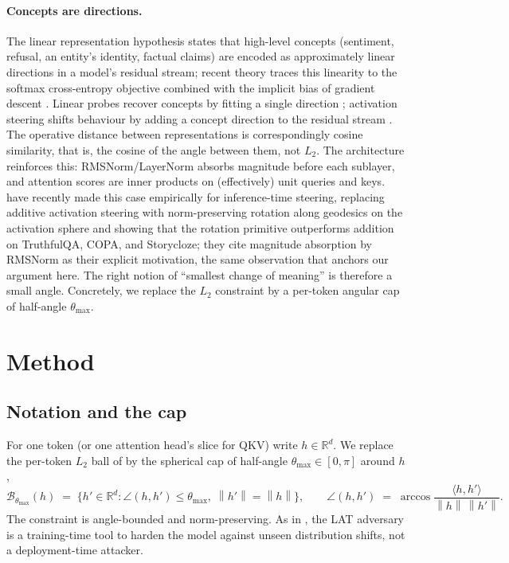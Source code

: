 \documentclass[11pt]{article}
\newcommand{\R}{\mathbb{R}}
\newcommand{\thmax}{\theta_{\max}}
\newcommand{\norm}[1]{\left\lVert#1\right\rVert}
\newcommand{\inner}[2]{\langle #1, #2 \rangle}
\begin{document}
\paragraph{Concepts are directions.} The linear representation hypothesis \citep[LRH;][]{mikolov2013distributed, park2023linear} states that high-level concepts (sentiment, refusal, an entity's identity, factual claims) are encoded as approximately linear directions in a model's residual stream; recent theory traces this linearity to the softmax cross-entropy objective combined with the implicit bias of gradient descent \citep{jiang2024origins}. Linear probes recover concepts by fitting a single direction \citep{burns2022discovering, marks2023geometry}; activation steering shifts behaviour by adding a concept direction to the residual stream \citep{turner2023activation, zou2023representation}. The operative distance between representations is correspondingly cosine similarity, that is, the cosine of the angle between them, not $L_2$. The architecture reinforces this: RMSNorm/LayerNorm absorbs magnitude before each sublayer, and attention scores are inner products on (effectively) unit queries and keys. \citet{you2026spherical} have recently made this case empirically for inference-time steering, replacing additive activation steering with norm-preserving rotation along geodesics on the activation sphere and showing that the rotation primitive outperforms addition on TruthfulQA, COPA, and Storycloze; they cite magnitude absorption by RMSNorm as their explicit motivation, the same observation that anchors our argument here. The right notion of ``smallest change of meaning'' is therefore a small angle. Concretely, we replace the $L_2$ constraint by a per-token angular cap of half-angle $\thmax$.

\section{Method}

\subsection{Notation and the cap}

For one token (or one attention head's slice for QKV) write $h \in \R^d$. We replace the per-token $L_2$ ball of \citet{casper2024lat} by the spherical cap of half-angle $\thmax \in [0, \pi]$ around $h$,
\begin{equation}
\mathcal{B}_{\thmax}(h) \;=\; \big\{ h' \in \R^d : \angle(h, h') \le \thmax,\; \norm{h'} = \norm{h} \big\},
\qquad
\angle(h, h') \;=\; \arccos\!\frac{\inner{h}{h'}}{\norm{h}\,\norm{h'}}.
\end{equation}
The constraint is angle-bounded and norm-preserving. As in \citet{casper2024lat}, the LAT adversary is a training-time tool to harden the model against unseen distribution shifts, not a deployment-time attacker.
\end{document}
